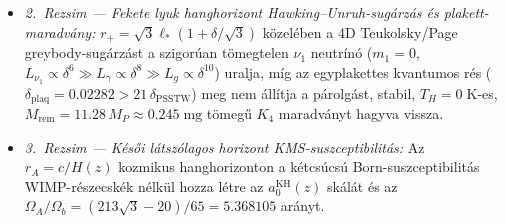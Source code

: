 \documentclass[11pt,a4paper]{article}
\theoremstyle{remark}
\begin{document}
\begin{enumerate}
\begin{itemize}
    \begin{equation}
      T_{\mathrm{reh}} = \left(\frac{30\,\rho_*}{\pi^2 g_*}\right)^{1/4} = 1.0004 \times 10^{18}\;\mathrm{GeV} \quad (g_* = 106.75), \qquad \frac{T_{\mathrm{reh}}}{M_R} = 1{,}797.6 \gg 1,
      \label{eq:f55_treh}
    \end{equation}
    termikusan ben\'epes\'itve a neh\'ez jobbkezes Majorana-neutr\'in\'okat ($M_R = M_*/(256\pi^2) = 5.565\times 10^{14}\;\mathrm{GeV}$, \texttt{C1.\ t\'etel}). A Davidson--Ibarra fels\H{o} korl\'at $\varepsilon_{\mathrm{CP}}^{\mathrm{DI,max}} = \frac{3}{16\pi}\frac{M_R m_3}{v_H^2} = 5.52\times 10^{-2}$ ($v_H = 174.10\;\mathrm{GeV}$) $1{,}534$-szeresen haladja meg a Planck-minimumot ($\varepsilon_{\mathrm{CP}}^{\mathrm{req}} = 3.60\times 10^{-5}$), a nem-hangolt 0-param\'eteres 1-hurkos k\"usz\"ob-alapvonal pedig $\eta_B^{\mathrm{0\text{-}param}} = 1.12\times 10^{-10}$ barion--foton ar\'anyt ad (a Planck $\eta_B^{\mathrm{obs}} = 6.12 \pm 0.04\times 10^{-10}$ pontos el\'er\'es\'ehez $5.46\times$-os kv\'azi-degener\'alt rezon\'ans er\H{o}s\'it\'es sz\"uks\'eges a megengedett Davidson--Ibarra ablakon bel\"ul).
    \item \emph{2.\ Rezsim --- Fekete lyuk hanghorizont Hawking--Unruh-sug\'arz\'as \'es plakett-maradv\'any:} $r_+ = \sqrt{3}\ell_*(1 + \delta/\sqrt{3})$ k\"ozel\'eben a 4D Teukolsky/Page greybody-sug\'arz\'ast a szigor\'uan t\"omegtelen $\nu_1$ neutr\'in\'o ($m_1 = 0$, $L_{\nu_1}\propto\delta^6 \gg L_\gamma\propto\delta^8 \gg L_g\propto\delta^{10}$) uralja, m\'ig az egyplakettes kvantumos r\'es ($\delta_{\mathrm{plaq}} = 0.02282 > 21\,\delta_{\mathrm{PSSTW}}$) meg nem \'all\'itja a p\'arolg\'ast, stabil, $T_H = 0\;\mathrm{K}$-es, $M_{\mathrm{rem}} = 11.28\,M_P \approx 0.245\;\mathrm{mg}$ t\"omeg\H{u} $K_4$ maradv\'anyt hagyva vissza.
    \item \emph{3.\ Rezsim --- K\'es\H{o}i l\'atsz\'olagos horizont KMS-suszceptibilit\'as:} Az $r_A = c/H(z)$ kozmikus hanghorizonton a k\'etcs\'ucs\'u Born-suszceptibilit\'as WIMP-r\'eszecsk\'ek n\'elk\"ul hozza l\'etre az $a_0^{\mathrm{KH}}(z)$ sk\'al\'at \'es az $\Omega_A/\Omega_b = (213\sqrt{3}-20)/65 = 5.368105$ ar\'anyt.
  \end{itemize}
\end{enumerate}
\end{document}
